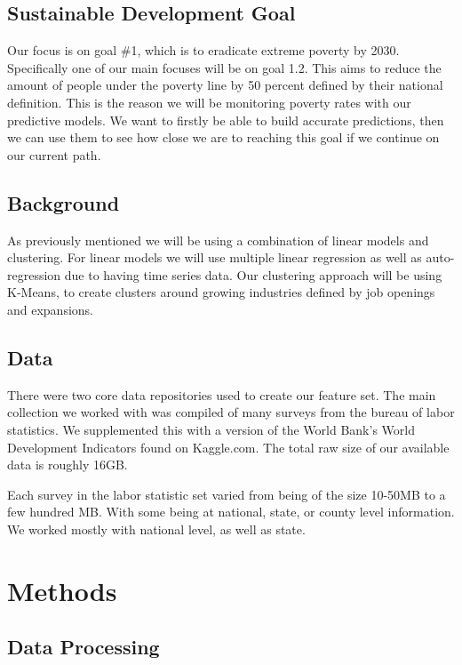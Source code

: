 \documentclass[11pt,letterpaper]{article}
\begin{document}
\subsection{Sustainable Development Goal}
\label{ssec:sdg}
Our focus is on goal \#1, which is to eradicate extreme poverty by 2030. Specifically one of our main focuses will be on goal 1.2. This aims to reduce the amount of people under the poverty line by 50 percent defined by their national definition. This is the reason we will be monitoring poverty rates with our predictive models. We want to firstly be able to build accurate predictions, then we can use them to see how close we are to reaching this goal if we continue on our current path. 

\subsection{Background}
\label{ssec:background}

As previously mentioned we will be using a combination of linear models and clustering. For linear models we will use multiple linear regression as well as auto-regression due to having time series data. Our clustering approach will be using K-Means, to create clusters around growing industries defined by job openings and expansions.

\subsection{Data}
\label{ssec:Data}

There were two core data repositories used to create our feature set. The main collection we worked with was compiled of many surveys from the bureau of labor statistics. We supplemented this with a version of the World Bank's World Development Indicators found on Kaggle.com. The total raw size of our available data is roughly 16GB. 

Each survey in the labor statistic set varied from being of the size 10-50MB to a few hundred MB. With some being at national, state, or county level information. We worked mostly with national level, as well as state.

\section{Methods}

\subsection{Data Processing}
\label{ssec:dataproc}
\end{document}
